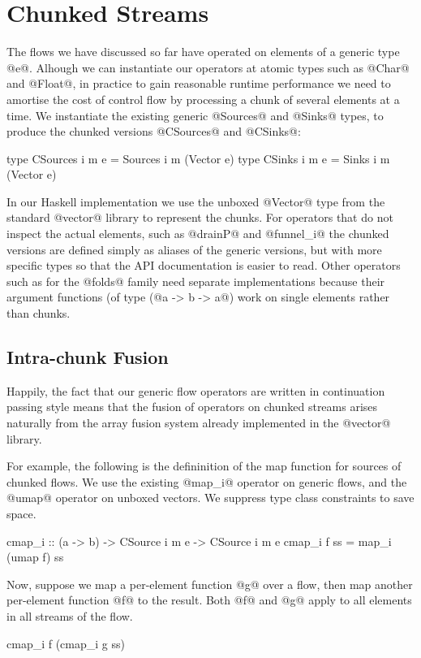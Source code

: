 \section{Chunked Streams}
\label{s:Chunked}
The flows we have discussed so far have operated on elements of a generic type @e@. Alhough we can instantiate our operators at atomic types such as @Char@ and @Float@, in practice to gain reasonable runtime performance we need to amortise the cost of control flow by processing a chunk of several elements at a time. We instantiate the existing generic @Sources@ and @Sinks@ types, to produce the chunked versions @CSources@ and @CSinks@:
\begin{code}
   type CSources i m e = Sources i m (Vector e)
   type CSinks   i m e = Sinks   i m (Vector e)
\end{code}

In our Haskell implementation we use the unboxed @Vector@ type from the standard @vector@ library to represent the chunks. For operators that do not inspect the actual elements, such as @drainP@ and @funnel_i@ the chunked versions are defined simply as aliases of the generic versions, but with more specific types so that the API documentation is easier to read. Other operators such as for the @folds@ family need separate implementations because their argument functions (of type (@a -> b -> a@) work on single elements rather than chunks. 


\subsection{Intra-chunk Fusion}
\label{s:IntraChunk}
Happily, the fact that our generic flow operators are written in continuation passing style means that the fusion of operators on chunked streams arises naturally from the array fusion system already implemented in the @vector@ library.

For example, the following is the defininition of the map function for sources of chunked flows. We use the existing @map_i@ operator on generic flows, and the @umap@ operator on unboxed vectors. We suppress type class constraints to save space.
\begin{code}
   cmap_i :: (a -> b) 
          -> CSource i m e -> CSource i m e
   cmap_i f ss = map_i (umap f) ss
\end{code}

Now, suppose we map a per-element function @g@ over a flow, then map another per-element function @f@ to the result. Both @f@ and @g@ apply to all elements in all streams of the flow.
\begin{code}
   cmap_i f (cmap_i g ss)
\end{code}

